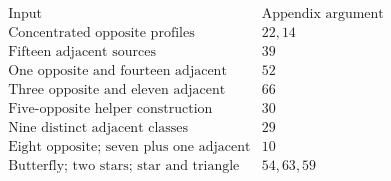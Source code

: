 \[\begin{array}{l|l}
\text{Input}&\text{Appendix argument}\\\hline
\text{Concentrated opposite profiles}&22,14\\
\text{Fifteen adjacent sources}&39\\
\text{One opposite and fourteen adjacent}&52\\
\text{Three opposite and eleven adjacent}&66\\
\text{Five-opposite helper construction}&30\\
\text{Nine distinct adjacent classes}&29\\
\text{Eight opposite; seven plus one adjacent}&10\\
\text{Butterfly; two stars; star and triangle}&54,63,59\\
\end{array}\]
